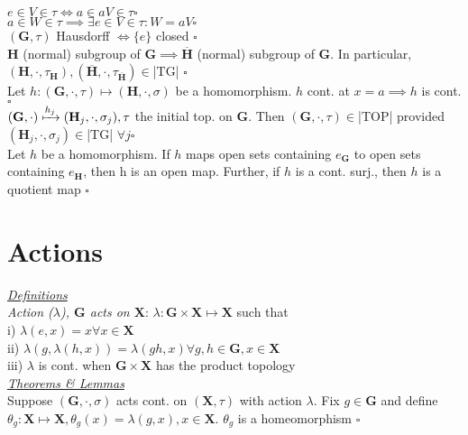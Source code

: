 $e\in V\in\tau\iff a\in aV\in\tau \square$\\
$a\in W\in\tau\implies\exists e\in V\in\tau:W=aV \square$\\
$(\mathbf{G},\tau)$ Hausdorff $\iff\{e\}$ closed $\square$\\
$\mathbf{H}$ (normal) subgroup of $\mathbf{G}\implies\overline{\mathbf{H}}$ (normal) subgroup of $\mathbf{G}.$ In particular, $(\mathbf{H},\cdot,\tau_\mathbf{H}),(\overline{\mathbf{H}},\cdot,\tau_{\overline{\mathbf{H}}})\in$|TG| $\square$\\
Let $h:(\mathbf{G},\cdot,\tau)\mapsto(\mathbf{H},\cdot,\sigma)$ be a homomorphism. $h$ cont. at $x=a\implies h$ is cont. $\square$\\
$(\mathbf{G},\cdot)\xmapsto{h_j}(\mathbf{H}_j,\cdot,\sigma_j),\tau$ the initial top. on $\mathbf{G}$. Then $(\mathbf{G},\cdot,\tau)\in$|TOP| provided $(\mathbf{H}_j,\cdot,\sigma_j)\in$|TG| $\forall j\square$\\
Let $h$ be a homomorphism. If $h$ maps open sets containing $e_\mathbf{G}$ to open sets containing $e_\mathbf{H}$, then h is an open map. Further, if $h$ is a cont. surj., then $h$ is a quotient map $\square$
\section{Actions}
\underline{\emph{Definitions}}\\
\emph{Action ($\lambda$), $\mathbf{G}$ acts on $\mathbf{X}$}: $\lambda:\mathbf{G}\times\mathbf{X}\mapsto\mathbf{X}$ such that\\
i) $\lambda(e,x)=x \forall x\in\mathbf{X}$\\
ii) $\lambda(g,\lambda(h,x))=\lambda(gh,x)\forall g,h\in\mathbf{G},x\in\mathbf{X}$\\
iii) $\lambda$ is cont. when $\mathbf{G}\times\mathbf{X}$ has the product topology
\\\underline{\emph{Theorems \& Lemmas}}\\
Suppose $(\mathbf{G},\cdot,\sigma)$ acts cont. on $(\mathbf{X},\tau)$ with action $\lambda$. Fix $g\in\mathbf{G}$ and define $\theta_g:\mathbf{X}\mapsto\mathbf{X}, \theta_g(x)=\lambda(g,x),x\in\mathbf{X}$. $\theta_g$ is a homeomorphism $\square$
